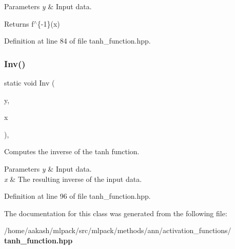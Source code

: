 \begin{DoxyParams}{Parameters}
{\em y} & Input data. \\
\hline
\end{DoxyParams}
\begin{DoxyReturn}{Returns}
f$^\wedge$\{-\/1\}(x) 
\end{DoxyReturn}


Definition at line 84 of file tanh\+\_\+function.\+hpp.

\mbox{\label{classmlpack_1_1ann_1_1TanhFunction_ad48548410161bbf6178eb1c293c991c3}} 
\subsubsection{Inv()\hspace{0.1cm}{\footnotesize\ttfamily [2/2]}}
{\footnotesize\ttfamily static void Inv (\begin{DoxyParamCaption}\item[{const Input\+Vec\+Type \&}]{y,  }\item[{Output\+Vec\+Type \&}]{x }\end{DoxyParamCaption})\hspace{0.3cm}{\ttfamily [inline]}, {\ttfamily [static]}}



Computes the inverse of the tanh function. 


\begin{DoxyParams}{Parameters}
{\em y} & Input data. \\
\hline
{\em x} & The resulting inverse of the input data. \\
\hline
\end{DoxyParams}


Definition at line 96 of file tanh\+\_\+function.\+hpp.



The documentation for this class was generated from the following file\+:\begin{DoxyCompactItemize}
\item 
/home/aakash/mlpack/src/mlpack/methods/ann/activation\+\_\+functions/\textbf{ tanh\+\_\+function.\+hpp}\end{DoxyCompactItemize}
